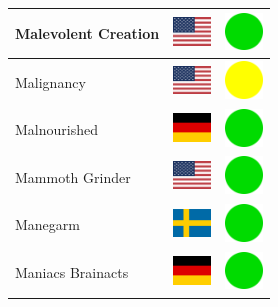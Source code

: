 \documentclass[12pt, a4paper, twoside]{report}
\begin{document}
\begin{center}
\begin{longtable}{|p{5cm}|p{2cm}|p{2cm}|}
 Malevolent Creation                                        & \includegraphics[width=1cm]{../img/flags/us} &   \includegraphics[width=1cm]{../likes/y} \\ \hline
 Malignancy                                                 & \includegraphics[width=1cm]{../img/flags/us} &   \includegraphics[width=1cm]{../likes/m} \\ \hline
 Malnourished                                               & \includegraphics[width=1cm]{../img/flags/de} &   \includegraphics[width=1cm]{../likes/y} \\ \hline
 Mammoth Grinder                                            & \includegraphics[width=1cm]{../img/flags/us} &   \includegraphics[width=1cm]{../likes/y} \\ \hline
 Manegarm                                                   & \includegraphics[width=1cm]{../img/flags/se} &   \includegraphics[width=1cm]{../likes/y} \\ \hline
 Maniacs Brainacts                                          & \includegraphics[width=1cm]{../img/flags/de} &   \includegraphics[width=1cm]{../likes/y} \\ \hline

\end{longtable}
\end{center}
\end{document}
